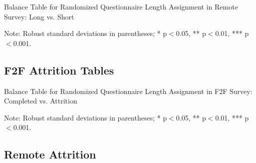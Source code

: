 \documentclass[11pt,harvard]{article}
\begin{document}
	
	\begin{table}[htbp]
		\centering
		\begin{adjustbox}{max width=\textwidth}
			\begin{threeparttable}
				\caption{Balance Table for Randomized Questionnaire Length Assignment in Remote Survey: Long vs. Short}
				\scriptsize
				 
				\label{tab:BF_Listing_Demo_Balance_RM_Length}
				\begin{tablenotes}
					\item Note: Robust standard deviations in parentheses; * p$<$0.05, ** p$<$0.01, *** p$<$0.001.
				\end{tablenotes}
			\end{threeparttable}
		\end{adjustbox}
	\end{table}
	
	\pagebreak
	
	\subsection{F2F Attrition Tables}
	
	\begin{table}[htbp]
		\centering
		\begin{adjustbox}{max width=\textwidth}
			\begin{threeparttable}
				\caption{Balance Table for Randomized Questionnaire Length Assignment in F2F Survey: Completed vs. Attrition}
				\scriptsize
				 
				\label{tab:BF_Listing_Demo_Attrition_F2F}
				\begin{tablenotes}
					\item Note: Robust standard deviations in parentheses; * p$<$0.05, ** p$<$0.01, *** p$<$0.001.
				\end{tablenotes}
			\end{threeparttable}
		\end{adjustbox}
	\end{table}
	
	\pagebreak
	
	\subsection{Remote Attrition}
	
\end{document}
